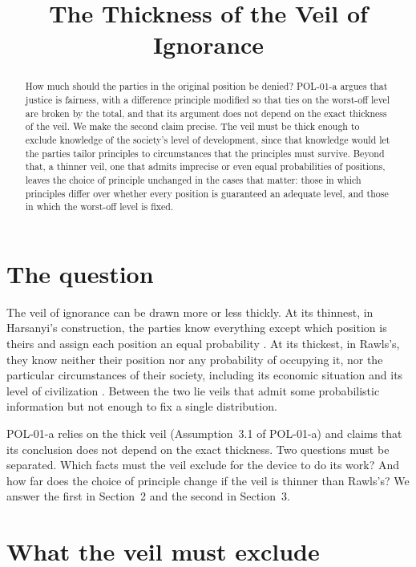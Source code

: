 \documentclass{situationist-preprint}
\title{The Thickness of the Veil of Ignorance}
\begin{document}
\maketitle

\begin{abstract}
How much should the parties in the original position be denied? POL-01-a argues that justice is fairness, with a difference principle modified so that ties on the worst-off level are broken by the total, and that its argument does not depend on the exact thickness of the veil. We make the second claim precise. The veil must be thick enough to exclude knowledge of the society's level of development, since that knowledge would let the parties tailor principles to circumstances that the principles must survive. Beyond that, a thinner veil, one that admits imprecise or even equal probabilities of positions, leaves the choice of principle unchanged in the cases that matter: those in which principles differ over whether every position is guaranteed an adequate level, and those in which the worst-off level is fixed.
\end{abstract}

\section{The question}

The veil of ignorance can be drawn more or less thickly. At its thinnest, in Harsanyi's construction, the parties know everything except which position is theirs and assign each position an equal probability \citep{Harsanyi1975}. At its thickest, in Rawls's, they know neither their position nor any probability of occupying it, nor the particular circumstances of their society, including its economic situation and its level of civilization \citep[\S 24]{Rawls1971}. Between the two lie veils that admit some probabilistic information but not enough to fix a single distribution.

POL-01-a relies on the thick veil (Assumption~3.1 of POL-01-a) and claims that its conclusion does not depend on the exact thickness. Two questions must be separated. Which facts must the veil exclude for the device to do its work? And how far does the choice of principle change if the veil is thinner than Rawls's? We answer the first in Section~2 and the second in Section~3.

\section{What the veil must exclude}
\end{document}

